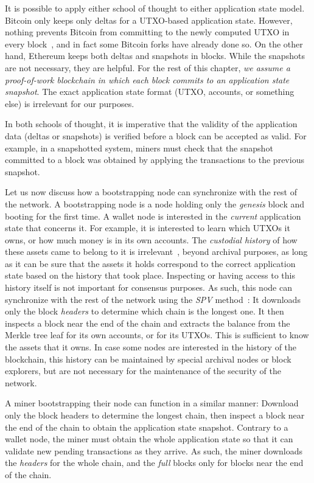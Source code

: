It is possible to apply either school of thought to either application
state model. Bitcoin only keeps only deltas for a UTXO-based application state.
However, nothing prevents Bitcoin from committing to the newly computed UTXO
in every block~\cite{rollerchain,bitcoin-prune,utreexo}, and in fact some Bitcoin
forks have already done so. On the other hand, Ethereum keeps both deltas and
snapshots in blocks. While the snapshots are not necessary, they are helpful.
For the rest of this chapter, \emph{we assume a proof-of-work blockchain in which
each block commits to an application state snapshot}. The exact application state
format (UTXO, accounts, or something else) is irrelevant for our purposes.

In both schools of thought, it is imperative that the validity of the application
data (deltas or snapshots) is verified before a block can be accepted as valid.
For example, in a snapshotted system, miners must check that the snapshot committed
to a block was obtained by applying the transactions to the previous snapshot.

Let us now discuss how a bootstrapping node can synchronize with the rest of the
network. A bootstrapping node is a node holding only the \emph{genesis} block and
booting for the first time. A wallet node is interested in the \emph{current} application
state that concerns it. For example, it is interested to learn which UTXOs it owns,
or how much money is in its own accounts. The \emph{custodial history} of how these
assets came to belong to it is irrelevant~\cite{utreexo}, beyond archival purposes, as long as it
can be sure that the
assets it holds correspond to the correct application state based on the history
that took place. Inspecting or having access to this history itself is not important
for consensus purposes.
As such, this node can synchronize with the rest of the network using the \emph{SPV}
method~\cite{bitcoin}: It downloads only the block \emph{headers} to determine which chain
is the longest one. It then inspects a block near the end of the chain and
extracts the balance from the Merkle tree leaf for its own accounts, or for its UTXOs.
This is sufficient to know the assets that it owns.
In case some nodes are interested in the history of the blockchain, this history
can be maintained by special archival nodes or block explorers, but are not
necessary for the maintenance of the security of the network.

A miner bootstrapping their node can function in a similar manner: Download
only the block headers to determine the longest chain, then inspect a block
near the end of the chain to obtain the application state snapshot. Contrary
to a wallet node, the miner must obtain the whole application state so that it
can validate new pending transactions as they arrive. As such, the miner downloads
the \emph{headers} for the whole chain, and the \emph{full} blocks only for blocks near the
end of the chain.

